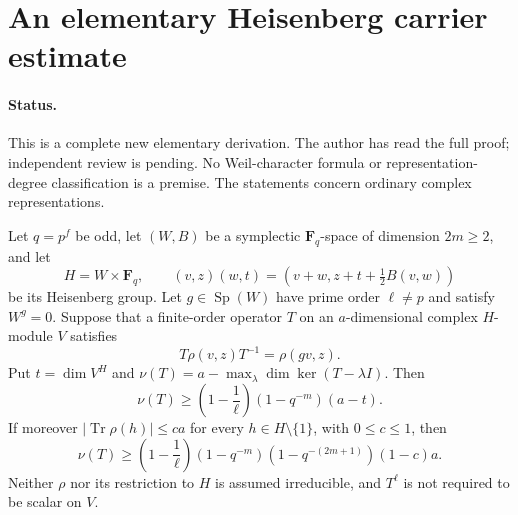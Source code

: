 \section{An elementary Heisenberg carrier estimate}
\label{sec:heisenberg-carrier}

\paragraph{Status.}
This is a complete new elementary derivation. The author has read
the full proof; independent review is pending. No Weil-character
formula or representation-degree classification is a premise.
The statements concern ordinary complex representations.

\begin{lemma}
\label{D-HOS-01}
Let $q=p^f$ be odd, let $(W,B)$ be a symplectic
$\mathbf F_q$-space of dimension $2m\ge2$, and let
\[
 H=W\times\mathbf F_q,\qquad
 (v,z)(w,t)=(v+w,z+t+\tfrac12 B(v,w))
                                                               \tag{HOS.1}
\]
be its Heisenberg group. Let $g\in\operatorname{Sp}(W)$ have
prime order $\ell\ne p$ and satisfy $W^g=0$. Suppose that a
finite-order operator $T$ on an $a$-dimensional complex
$H$-module $V$ satisfies
\[
 T\rho(v,z)T^{-1}=\rho(gv,z).
                                                               \tag{HOS.2}
\]
Put $t=\dim V^H$ and
$\nu(T)=a-\max_\lambda\dim\ker(T-\lambda I)$. Then
\[
 \nu(T)\ge
 \left(1-\frac1\ell\right)(1-q^{-m})(a-t).
                                                               \tag{HOS.3}
\]
If moreover $|\operatorname{Tr}\rho(h)|\le ca$ for every
$h\in H\setminus\{1\}$, with $0\le c\le1$, then
\[
 \nu(T)\ge
 \left(1-\frac1\ell\right)(1-q^{-m})
       (1-q^{-(2m+1)})(1-c)a.
                                                               \tag{HOS.4}
\]
Neither $\rho$ nor its restriction to $H$ is assumed irreducible,
and $T^\ell$ is not required to be scalar on $V$.
\end{lemma}

